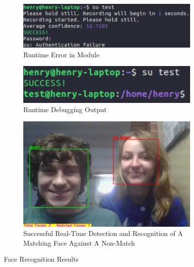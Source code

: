 \documentclass[
]{article}
\begin{document}
\begin{figure}[htbp]
  \centering
  \begin{subfigure}[b]{0.3\textwidth}
    \includegraphics[width=\textwidth]{images/runtime_error.png}
    \caption{Runtime Error in Module}
  \end{subfigure}
  \hfill
  \begin{subfigure}[b]{0.3\textwidth}
    \includegraphics[width=\textwidth]{images/runtime_debug.png}
    \caption{Runtime Debugging Output}
  \end{subfigure}
  \hfill
  \begin{subfigure}[b]{0.3\textwidth}
    \includegraphics[width=\textwidth]{images/demo_result.png}
    \caption{Successful Real-Time Detection and Recognition of A Matching Face Against A Non-Match}
  \end{subfigure}
  \caption{Face Recognition Results}
\end{figure}
\end{document}
